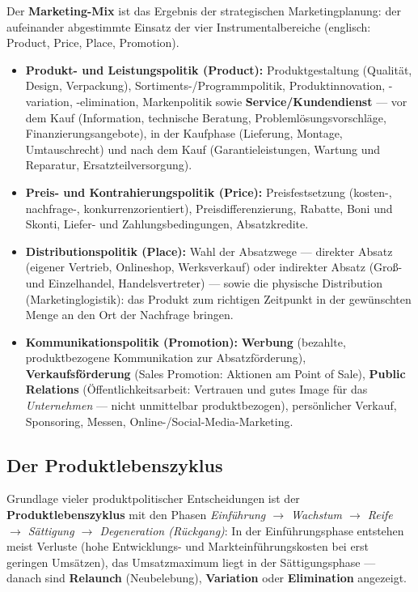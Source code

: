 \documentclass[11pt, a4paper]{article}
\begin{document}
Der \textbf{Marketing-Mix} ist das Ergebnis der strategischen Marketingplanung: der
aufeinander abgestimmte Einsatz der vier Instrumentalbereiche (englisch: Product, Price,
Place, Promotion).

\begin{itemize}
  \item \textbf{Produkt- und Leistungspolitik (Product):} Produktgestaltung (Qualität,
    Design, Verpackung), Sortiments-/Programmpolitik, Produktinnovation, -variation,
    -elimination, Markenpolitik sowie \textbf{Service/Kundendienst} --- vor dem Kauf
    (Information, technische Beratung, Problemlösungsvorschläge, Finanzierungsangebote),
    in der Kaufphase (Lieferung, Montage, Umtauschrecht) und nach dem Kauf
    (Garantieleistungen, Wartung und Reparatur, Ersatzteilversorgung).
  \item \textbf{Preis- und Kontrahierungspolitik (Price):} Preisfestsetzung
    (kosten-, nachfrage-, konkurrenzorientiert), Preisdifferenzierung, Rabatte, Boni und
    Skonti, Liefer- und Zahlungsbedingungen, Absatzkredite.
  \item \textbf{Distributionspolitik (Place):} Wahl der Absatzwege --- direkter Absatz
    (eigener Vertrieb, Onlineshop, Werksverkauf) oder indirekter Absatz (Groß- und
    Einzelhandel, Handelsvertreter) --- sowie die physische Distribution
    (Marketinglogistik): das Produkt zum richtigen Zeitpunkt in der gewünschten Menge an
    den Ort der Nachfrage bringen.
  \item \textbf{Kommunikationspolitik (Promotion):} \textbf{Werbung} (bezahlte,
    produktbezogene Kommunikation zur Absatzförderung), \textbf{Verkaufsförderung}
    (Sales Promotion: Aktionen am Point of Sale), \textbf{Public Relations}
    (Öffentlichkeitsarbeit: Vertrauen und gutes Image für das \emph{Unternehmen} ---
    nicht unmittelbar produktbezogen), persönlicher Verkauf, Sponsoring, Messen,
    Online-/Social-Media-Marketing.
\end{itemize}

\subsection{Der Produktlebenszyklus}

Grundlage vieler produktpolitischer Entscheidungen ist der \textbf{Produktlebenszyklus}
mit den Phasen \emph{Einführung $\rightarrow$ Wachstum $\rightarrow$ Reife $\rightarrow$
Sättigung $\rightarrow$ Degeneration (Rückgang)}: In der Einführungsphase entstehen
meist Verluste (hohe Entwicklungs- und Markteinführungskosten bei erst geringen
Umsätzen), das Umsatzmaximum liegt in der Sättigungsphase --- danach sind
\textbf{Relaunch} (Neubelebung), \textbf{Variation} oder \textbf{Elimination} angezeigt.
\end{document}
